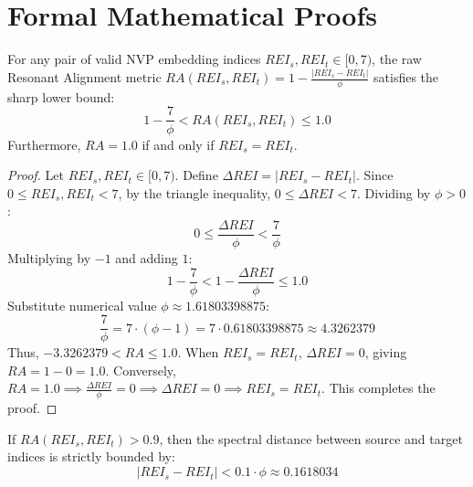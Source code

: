 \section{Formal Mathematical Proofs}

\begin{theorem}
For any pair of valid NVP embedding indices $REI_s, REI_t \in [0, 7)$, the raw Resonant Alignment metric $RA(REI_s, REI_t) = 1 - \frac{|REI_s - REI_t|}{\phi}$ satisfies the sharp lower bound:
\begin{equation}
    1 - \frac{7}{\phi} < RA(REI_s, REI_t) \le 1.0
\end{equation}
Furthermore, $RA = 1.0$ if and only if $REI_s = REI_t$.
\end{theorem}

\begin{proof}
Let $REI_s, REI_t \in [0, 7)$. Define $\Delta REI = |REI_s - REI_t|$.
Since $0 \le REI_s, REI_t < 7$, by the triangle inequality, $0 \le \Delta REI < 7$.
Dividing by $\phi > 0$:
\begin{equation}
    0 \le \frac{\Delta REI}{\phi} < \frac{7}{\phi}
\end{equation}
Multiplying by $-1$ and adding $1$:
\begin{equation}
    1 - \frac{7}{\phi} < 1 - \frac{\Delta REI}{\phi} \le 1.0
\end{equation}
Substitute numerical value $\phi \approx 1.61803398875$:
\begin{equation}
    \frac{7}{\phi} = 7 \cdot (\phi - 1) = 7 \cdot 0.61803398875 \approx 4.3262379
\end{equation}
Thus, $-3.3262379 < RA \le 1.0$.
When $REI_s = REI_t$, $\Delta REI = 0$, giving $RA = 1 - 0 = 1.0$. Conversely, $RA = 1.0 \implies \frac{\Delta REI}{\phi} = 0 \implies \Delta REI = 0 \implies REI_s = REI_t$. This completes the proof.
\end{proof}

\begin{theorem}
If $RA(REI_s, REI_t) > 0.9$, then the spectral distance between source and target indices is strictly bounded by:
\begin{equation}
    |REI_s - REI_t| < 0.1 \cdot \phi \approx 0.1618034
\end{equation}
\end{theorem}

